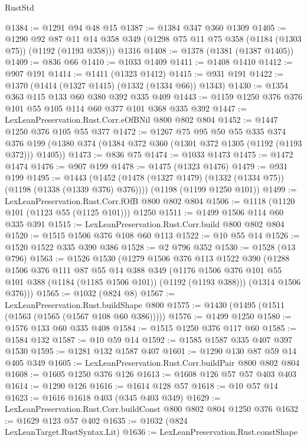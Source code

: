 \begin{lexlean}{RustStd}
\begin{coremodule}
@1384 := @1291 @94 @48 @15
@1387 := @1384 @347 @360 @1309
@1405 := @1290
    @92
    @87
    @11
    @14
    @358
    @349
    (@1298 @75 @11 @75 @358 (@1184 (@1303 @75)) (@1192 (@1193 @358)))
    @1316
@1408 := @1378 (@1381 (@1387 @1405))
@1409 := @836 @66
@1410 := @1033 @1409
@1411 := @1408 @1410
@1412 := @907 @191
@1414 := @1411 (@1323 @1412)
@1415 := @931 @191
@1422 := @1370 (@1414 (@1327 @1415) (@1332 (@1334 @66)) @1343)
@1430 := @1354 @363 @115 @133 @60 @380 @392 @335 @409
@1443 := @1159 @1250 @376 @376 @101 @55 @105 @114 @60 @377 @101 @368 @335 @392
@1447 := LexLeanPreservation.Rust.Corr.eOfBNil @800 @802 @804
@1452 := @1447 @1250 @376 @105 @55 @377
@1472 := @1267
    @75
    @95
    @50
    @55
    @335
    @374
    @376
    @199
    (@1380 @374 (@1384 @372 @360 (@1301 @372 @1305 (@1192 (@1193 @372))) @1405))
@1473 := @836 @75
@1474 := @1033 @1473
@1475 := @1472 @1474
@1476 := @907 @199
@1478 := @1475 (@1323 @1476)
@1479 := @931 @199
@1495 := @1443
    (@1452 (@1478 (@1327 @1479) (@1332 (@1334 @75)) (@1198 (@1338 (@1339 @376) @376))))
    (@1198 (@1199 @1250 @101))
@1499 := LexLeanPreservation.Rust.Corr.fOfB @800 @802 @804
@1506 := @1118 (@1120 @101 (@1123 @55 (@1125 @101))) @1250
@1511 := @1499 @1506 @114 @60 @335 @391
@1515 := LexLeanPreservation.Rust.Corr.build @800 @802 @804
@1520 := @1515 @1506 @376 @108 @60 @113
@1522 := @10 @55 @14
@1526 := @1520 @1522 @335 @390 @386
@1528 := @2 @796 @352
@1530 := @1528 (@13 @796)
@1563 := @1526
    @1530
    (@1279
      @1506
      @376
      @113
      @1522
      @390
      (@1288
        @1506
        @376
        @111
        @87
        @55
        @14
        @388
        @349
        (@1176 @1506 @376 @101 @55 @101 @388 (@1184 (@1185 @1506 @101)) (@1192 (@1193 @388)))
        (@1314 @1506 @376)))
@1565 := @1032 (@824 @8)
@1567 := LexLeanPreservation.Rust.buildShape @800
@1575 := @1430 (@1495 (@1511 (@1563 (@1565 (@1567 @108 @60 @386)))))
@1576 := @1499 @1250
@1580 := @1576 @133 @60 @335 @408
@1584 := @1515 @1250 @376 @117 @60
@1585 := @1584 @132
@1587 := @10 @59 @14
@1592 := @1585 @1587 @335 @407 @397 @1530
@1595 := @1281 @132 @1587 @407
@1601 := @1290 @130 @87 @59 @14 @405 @349
@1605 := LexLeanPreservation.Rust.Corr.buildPair @800 @802 @804
@1608 := @1605 @1250 @376 @126
@1613 := @1608 @126 @57 @57 @403 @403
@1614 := @1290 @126
@1616 := @1614 @128 @57
@1618 := @10 @57 @14
@1623 := @1616 @1618 @403 (@345 @403 @349)
@1629 := LexLeanPreservation.Rust.Corr.buildConst @800 @802 @804 @1250 @376
@1632 := @1629 @123 @57 @402
@1635 := @1032 (@824 LexLeanTarget.RustSyntax.Lit)
@1636 := LexLeanPreservation.Rust.constShape

\end{coremodule}
\end{lexlean}
